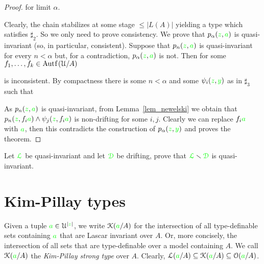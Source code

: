\documentclass[creche.tex]{subfiles}
\begin{document}
\begin{proof}
\quad for limit $\alpha$.

\noindent Clearly, the chain stabilizes at some stage $\le|L(A)|$ yielding a type which satisfies $\sharp_2$. So we only need to prove consistency. We prove that $p_\alpha({\color{green} z},{\color{green} a})$ is quasi-invariant (so, in particular, consistent). Suppose that $p_n({\color{green} z},{\color{green} a})$ is quasi-invariant for every $n<\alpha$ but, for a contradiction, $p_\alpha({\color{green} z},{\color{green} a})$ is not. Then for some $f_1,\dots,f_k\in\mathord{\rm Aut\kern.15ex{f}\kern.15ex}(\EuScript U/A)$


\noindent is inconsistent. By compactness there is some $n<\alpha$ and some $\psi_i({\color{green} z},{\color{green} y})$ as in $\sharp_3$ such that


As $p_n({\color{green} z},{\color{green} a})$ is quasi-invariant, from Lemma~\ref{lem_newelski} we obtain that $p_n({\color{green} z},f_i{\color{green} a})\wedge\psi_j({\color{green} z},f_i{\color{green} a})$ is non-drifting for some $i,j$. Clearly we can replace $f_i{\color{green} a}$ with ${\color{green} a}$, then this contradicts the construction of $p_\alpha({\color{green} z},{\color{green} y})$ and proves the theorem.
\end{proof}

\begin{exercise}
Let ${\color{green}\EuScript L}$ be quasi-invariant and let ${\color{green}\EuScript D}$ be drifting, prove that  ${\color{green}\EuScript L}\smallsetminus{\color{green}\EuScript D}$ is quasi-invariant.\QED
\end{exercise}

\section{Kim-Pillay types}\label{KPtypes}


Given a tuple ${\color{green} a}\in\EuScript U^{|{\color{green} z}|}$, we write \emph{$\EuScript K({\color{green} a}/A)$\/} for the intersection of all type-definable sets containing ${\color{green} a}$ that are Lascar invariant over $A$. Or, more concisely, the intersection of all sets that are type-definable over a model containing $A$. We call $\EuScript K({\color{green} a}/A)$ the \emph{Kim-Pillay strong type\/} over $A$. Clearly,  $\EuScript L({\color{green} a}/A)\subseteq\EuScript K({\color{green} a}/A)\subseteq\EuScript O({\color{green} a}/A)$. 
\end{document}
